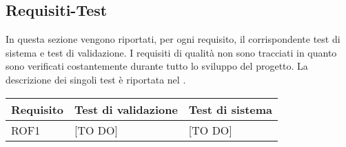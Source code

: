 \subsection{Requisiti-Test} %
\label{sub:requisiti_test}
In questa sezione vengono riportati, per ogni requisito, il corrispondente test di sistema e test di validazione. I requisiti di qualità non sono tracciati in quanto sono verificati costantemente durante tutto lo sviluppo del progetto. La descrizione dei singoli test è riportata nel \docNameVersionPdQ.
	\begin{center}

	\def\arraystretch{1.5}
	\bgroup
	\begin{longtable}{| p{4cm} | p{4cm} | p{4cm} |}

		\hline
		\textbf{Requisito} & \textbf{Test di validazione} &  \textbf{Test di sistema} \\
		\hline


		ROF1  & [TO DO] & [TO DO] \\
		\hline


	\end{longtable}
	\egroup
	\end{center}

